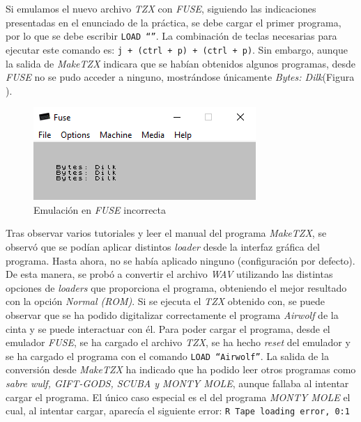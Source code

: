 \documentclass{article}
\begin{document}
Si emulamos el nuevo archivo \textit{TZX} con \textit{FUSE}, siguiendo las indicaciones presentadas en el enunciado de la práctica, se debe cargar el primer programa, por lo que se debe escribir \texttt{LOAD ``''}. La combinación de teclas necesarias para ejecutar este comando es: \texttt{j + (ctrl + p) + (ctrl + p)}. Sin embargo, aunque la salida de \textit{MakeTZX} indicara que se habían obtenidos algunos programas, desde \textit{FUSE} no se pudo acceder a ninguno, mostrándose únicamente \textit{Bytes: Dilk}(Figura ).\\
\begin{figure}[h!]
    \centering
    \includegraphics[scale=0.6]{images/fuse-stereo-to-mono.png}
    \caption{Emulación en \textit{FUSE} incorrecta}
    \label{fig:fuse-stereo-to-mono}
\end{figure}

Tras observar varios tutoriales y leer el manual del programa \textit{MakeTZX}, se observó que se podían aplicar distintos \textit{loader} desde la interfaz gráfica del programa. Hasta ahora, no se había aplicado ninguno (configuración por defecto). De esta manera, se probó a convertir el archivo \textit{WAV} utilizando las distintas opciones de \textit{loaders} que proporciona el programa, obteniendo el mejor resultado con la opción \textit{Normal (ROM)}. Si se ejecuta el \textit{TZX} obtenido con, se puede observar que se ha podido digitalizar correctamente el programa \textit{Airwolf} de la cinta y se puede interactuar con él. Para poder cargar el programa, desde el emulador \textit{FUSE}, se ha cargado el archivo \textit{TZX}, se ha hecho \textit{reset} del emulador y se ha cargado el programa con el comando \texttt{LOAD ``Airwolf''}. La salida de la conversión desde \textit{MakeTZX} ha indicado que ha podido leer otros programas como \textit{sabre wulf, GIFT-GODS, SCUBA y MONTY MOLE}, aunque fallaba al intentar cargar el programa. El único caso especial es el del programa \textit{MONTY MOLE} el cual, al intentar cargar, aparecía el siguiente error: \texttt{R Tape loading error, 0:1}\\
\end{document}
